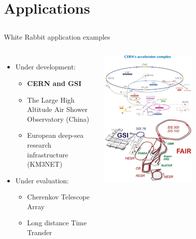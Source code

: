 \documentclass[compress, red]{beamer}
\begin{document}
\section{Applications}
\subsection{}

\begin{frame}{White Rabbit application examples}
\begin{columns}[c]
    \begin{itemize}
      \item Under development:
      \begin{itemize}
	\item \textbf{CERN and GSI}
	\item The Large High Altitude Air Shower Observatory (China)
	\item European deep-sea research infrastructure (KM3NET) 
      \end{itemize}         	
      \item Under evaluation:
      \begin{itemize}
	\item Cherenkov Telescope Array
	\item Long distance Time Transfer
      \end{itemize}         	
    \end{itemize}    
    \begin{center}
      \includegraphics[width=0.6\textwidth]{../../figures/applications/gsiANDcern.pdf}
      \end{center}
\end{columns}
\end{frame}
\end{document}
